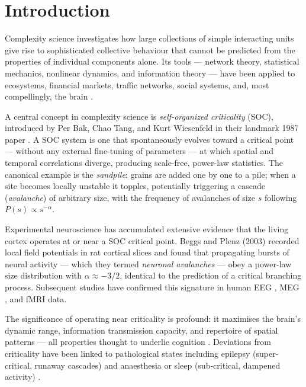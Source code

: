 \documentclass[12pt,a4paper]{article}
\begin{document}
\setcounter{tocdepth}{2}
\tableofcontents
\newpage

\section{Introduction}
\label{sec:intro}

Complexity science investigates how large collections of simple
interacting units give rise to sophisticated collective behaviour that
cannot be predicted from the properties of individual components
alone.  Its tools — network theory, statistical mechanics, nonlinear
dynamics, and information theory — have been applied to ecosystems,
financial markets, traffic networks, social systems, and, most
compellingly, the brain \cite{strogatz2001,barabasi2004,bak1987}.

A central concept in complexity science is \emph{self-organized
criticality} (SOC), introduced by Per Bak, Chao Tang, and Kurt
Wiesenfeld in their landmark 1987 paper \cite{bak1987}.  A SOC system
is one that spontaneously evolves toward a critical point — without any
external fine-tuning of parameters — at which spatial and temporal
correlations diverge, producing scale-free, power-law statistics.
The canonical example is the \emph{sandpile}: grains are added one by
one to a pile; when a site becomes locally unstable it topples,
potentially triggering a cascade (\emph{avalanche}) of arbitrary size,
with the frequency of avalanches of size $s$ following $P(s) \propto
s^{-\alpha}$.

Experimental neuroscience has accumulated extensive evidence that the
living cortex operates at or near a SOC critical point.  Beggs and
Plenz (2003) \cite{beggs2003} recorded local field potentials in rat
cortical slices and found that propagating bursts of neural activity —
which they termed \emph{neuronal avalanches} — obey a power-law
size distribution with $\alpha \approx -3/2$, identical to the
prediction of a critical branching process.  Subsequent studies have
confirmed this signature in human EEG \cite{linkenkaer2001}, MEG
\cite{palva2013}, and fMRI \cite{haimovici2013} data.

The significance of operating near criticality is profound:  it
maximises the brain's dynamic range, information transmission capacity,
and repertoire of spatial patterns — all properties thought to underlie
cognition \cite{shew2011,kinouchi2006}.  Deviations from criticality
have been linked to pathological states including epilepsy
(super-critical, runaway cascades) and anaesthesia or sleep
(sub-critical, dampened activity) \cite{meisel2012}.
\end{document}
